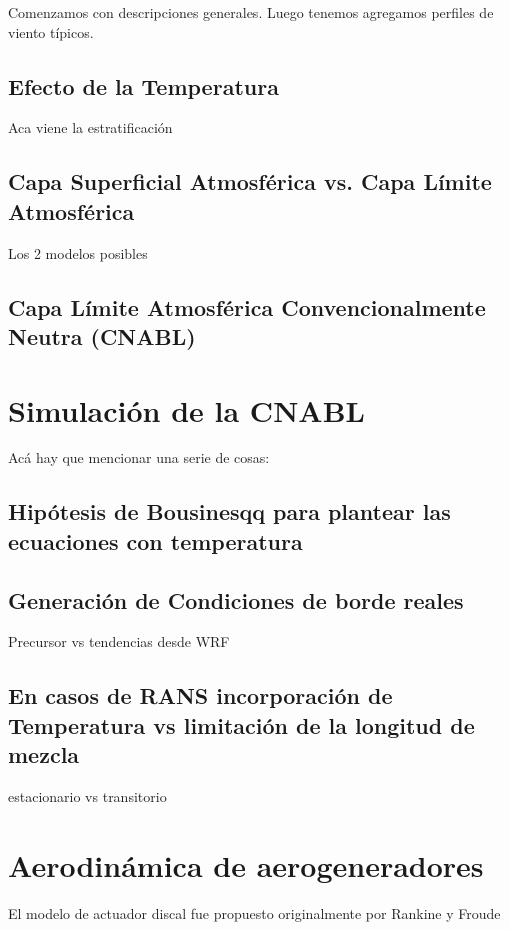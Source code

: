 Comenzamos con descripciones generales.
Luego tenemos agregamos perfiles de viento típicos. 

\subsection{Efecto de la Temperatura}

Aca viene la estratificación

\subsection{Capa Superficial Atmosférica vs. Capa Límite Atmosférica}

Los 2 modelos posibles

\subsection{Capa Límite Atmosférica Convencionalmente Neutra (CNABL)}

\section{Simulación de la CNABL}

Acá hay que mencionar una serie de cosas:

\subsection{Hipótesis de Bousinesqq para plantear las ecuaciones con temperatura}
\subsection{Generación de Condiciones de borde reales}
Precursor vs tendencias desde WRF
\subsection{En casos de RANS incorporación de Temperatura vs limitación de la longitud de mezcla}
estacionario vs transitorio




\section{Aerodinámica de aerogeneradores}

El modelo de actuador discal fue propuesto originalmente por Rankine \citep{rankine1865} y Froude \citep{froude1889}


